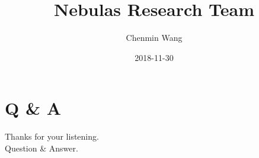 \documentclass[10pt, mathserif]{beamer} %
\begin{document}
\title[Research Team]{Nebulas Research Team}
\author{Chenmin Wang}

\date{2018-11-30}


\begin{frame}
    \titlepage	%
\end{frame}




\section{Q \& A}
\begin{frame}
	Thanks for your listening. \\
	Question \& Answer.
\end{frame}
\end{document}
